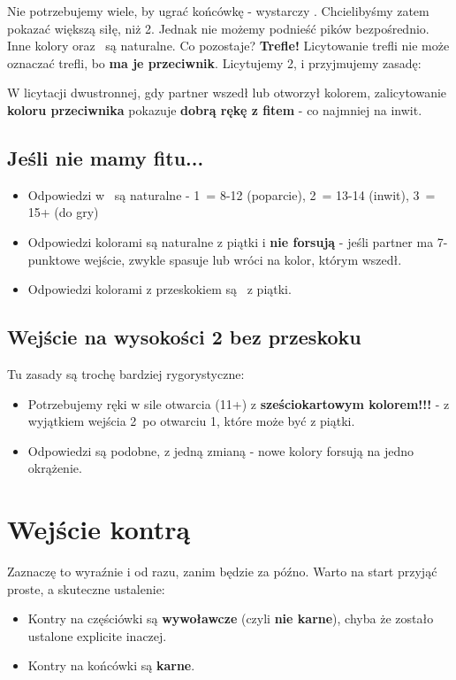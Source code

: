 \documentclass[12pt, a4paper]{article}
\begin{document}
    Nie potrzebujemy wiele, by ugrać końcówkę - wystarczy . Chcielibyśmy zatem 
    pokazać większą siłę, niż 2\spades. Jednak nie możemy podnieść pików bezpośrednio. Inne kolory oraz \nt\ są naturalne.
    Co pozostaje? \textbf{Trefle!} Licytowanie trefli nie może oznaczać trefli, bo \textbf{ma je przeciwnik}.
     Licytujemy 2\clubs, i przyjmujemy zasadę:

    \begin{formal}
        W licytacji dwustronnej, gdy partner wszedł lub otworzył kolorem, zalicytowanie \textbf{koloru przeciwnika}
        pokazuje \textbf{dobrą rękę z fitem} - co najmniej na inwit.
    \end{formal}

    \subsection{Jeśli nie mamy fitu...}
    \begin{itemize}
        \item Odpowiedzi w \nt\ są naturalne - 1\nt\ = 8-12 (poparcie), 2\nt\ = 13-14 (inwit), 3\nt\ = 15+ (do gry)
        \item Odpowiedzi kolorami są naturalne z piątki i \textbf{nie forsują} - jeśli partner ma 7-punktowe wejście, zwykle spasuje
        lub wróci na kolor, którym wszedł.
        \item Odpowiedzi kolorami z przeskokiem są \gf\ z piątki.
    \end{itemize}

    \subsection{Wejście na wysokości 2 bez przeskoku}
    Tu zasady są trochę bardziej rygorystyczne:
    \begin{itemize}
        \item Potrzebujemy ręki w sile otwarcia (11+) z 
        \textbf{sześciokartowym kolorem!!!} - z wyjątkiem wejścia 2\hearts\ po otwarciu 1\spades, które może być z piątki.
        \item Odpowiedzi są podobne, z jedną zmianą - nowe kolory forsują na jedno okrążenie.
    \end{itemize} 

    
    \pagebreak
    \section{Wejście kontrą}
    Zaznaczę to wyraźnie i od razu, zanim będzie za późno. Warto na start przyjąć proste, a skuteczne ustalenie:
    \begin{formal}
        \begin{itemize}
            \item Kontry na częściówki są \textbf{wywoławcze} (czyli \textbf{nie karne}),
            chyba że zostało ustalone explicite inaczej.
            \item Kontry na końcówki są \textbf{karne}.
        \end{itemize}
    \end{formal}
\end{document}
